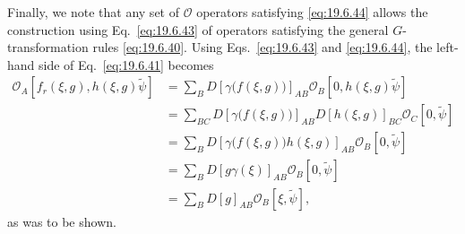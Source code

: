 Finally, we note that any set of $\mathcal O$ operators satisfying \eqref{eq:19.6.44} allows the construction using Eq.~\eqref{eq:19.6.43} of operators satisfying the general $G$-transformation rules \eqref{eq:19.6.40}. Using Eqs.~\eqref{eq:19.6.43} and \eqref{eq:19.6.44}, the left-hand side of Eq.~\eqref{eq:19.6.41} becomes
\[
\begin{aligned}
\mathcal O_A\left[
f_r(\xi,g),h(\xi,g)\widetilde\psi\right]
&=\sum_BD\left[\gamma\bigl(f(\xi,g)\bigr)\right]_{AB}
\mathcal O_B[0,h(\xi,g)\widetilde\psi]
\\
&=\sum_{BC}
D\left[\gamma\bigl(f(\xi,g)\bigr)\right]_{AB}
D[h(\xi,g)]_{BC}\mathcal O_C[0,\widetilde\psi]
\\
&=\sum_BD\left[
\gamma\bigl(f(\xi,g)\bigr)h(\xi,g)\right]_{AB}
\mathcal O_B[0,\widetilde\psi]
\\
&=\sum_BD[g\gamma(\xi)]_{AB}\mathcal O_B[0,\widetilde\psi]
\\
&=\sum_BD[g]_{AB}\mathcal O_B[\xi,\widetilde\psi],
\end{aligned}
\]
as was to be shown.

